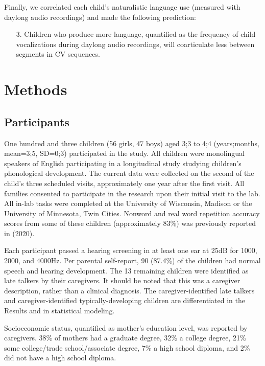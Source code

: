 \documentclass[a4paper,man,natbib,donotrepeattitle, apacite]{apa6}
\begin{document}
Finally, we correlated each child’s naturalistic language use (measured with daylong audio recordings) and made the following prediction:

\begin{enumerate}
\item[3.] Children who produce more language, quantified as the frequency of child vocalizations during daylong audio recordings, will coarticulate less between segments in CV sequences.
\end{enumerate}

\section{Methods}

\subsection{Participants}

One hundred and three children (56 girls, 47 boys) aged 3;3 to 4;4 (years;months, mean=3;5, SD=0;3) participated in the study. All children were monolingual speakers of English participating in a longitudinal study studying children’s phonological development. The current data were collected on the second of the child’s three scheduled visits, approximately one year after the first visit. All families consented to participate in the research upon their initial visit to the lab. All in-lab tasks were completed at the University of Wisconsin, Madison or the University of Minnesota, Twin Cities. Nonword and real word repetition accuracy scores from some of these children (approximately 83\%) was previously reported in \citeauthor{cychoszLexicalAdvantageFouryearold2020} (2020).

Each participant passed a hearing screening in at least one ear at 25dB for 1000, 2000, and 4000Hz. Per parental self-report, 90 (87.4\%) of the children had normal speech and hearing development. The 13 remaining children were identified as late talkers by their caregivers. It should be noted that this was a caregiver description, rather than a clinical diagnosis. The caregiver-identified late talkers and caregiver-identified typically-developing children are differentiated in the Results and in statistical modeling. 

Socioeconomic status, quantified as mother’s education level, was reported by caregivers. 38\% of mothers had a graduate degree, 32\% a college degree, 21\% some college/trade school/associate degree, 7\% a high school diploma, and 2\% did not have a high school diploma. 
\end{document}
